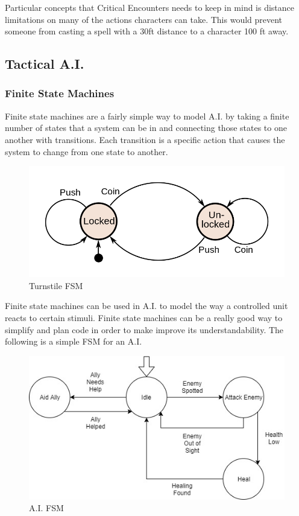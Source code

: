 \documentclass[12pt,a4paper]{report}
\begin{document}
			Particular concepts that Critical Encounters needs to keep in mind is distance limitations on many of the actions characters can take. This would prevent someone from casting a spell with a 30ft distance to a character 100 ft away.
		
		\subsection{Tactical A.I.}
		\subsubsection{Finite State Machines}
		Finite state machines are a fairly simple way to model A.I. by taking a finite number of states that a system can be in and connecting those states to one another with transitions. Each transition is a specific action that causes the system to change from one state to another. 
		
		\begin{figure}[H]
			\centering
			\includegraphics[scale=.55]{FSMWikipedia}
			\caption{Turnstile FSM \cite{finitestatewiki}}
			\label{fig: FSM}
		\end{figure}
		
		Finite state machines can be used in A.I. to model the way a controlled unit reacts to certain stimuli. Finite state machines can be a really good way to simplify and plan code in order to make improve its understandability. The following is a simple FSM for an A.I.
		
		\begin{figure}[H]
			\centering
			\includegraphics[scale=.7]{AIFSM}
			\caption{A.I. FSM}
			\label{fig: A.I. FSM}
		\end{figure}
		
\end{document}
